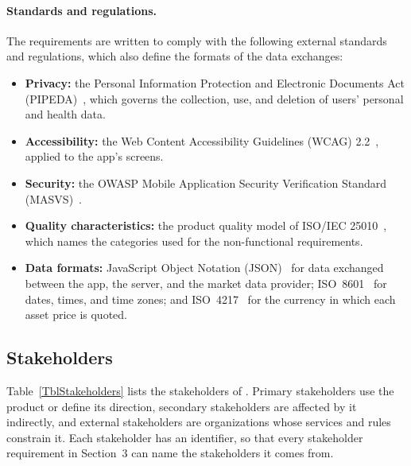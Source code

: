\documentclass[12pt]{article}
\begin{document}
\paragraph{Standards and regulations.} The requirements are written to comply
with the following external standards and regulations, which also define the
formats of the data \progname{} exchanges:
{\sloppy
\begin{itemize}
  \item \textbf{Privacy:} the Personal Information Protection and Electronic
        Documents Act (PIPEDA)~\citep{PIPEDA}, which governs the collection, use, and
        deletion of users' personal and health data.
  \item \textbf{Accessibility:} the Web Content Accessibility Guidelines (WCAG)
        2.2~\citep{WCAG22}, applied to the app's screens.
  \item \textbf{Security:} the OWASP Mobile Application Security Verification
        Standard (MASVS)~\citep{OWASPMASVS}.
  \item \textbf{Quality characteristics:} the product quality model of ISO/IEC
        25010~\citep{ISOIEC25010_2023}, which names the categories used for the
        non-functional requirements.
  \item \textbf{Data formats:} JavaScript Object Notation (JSON)~\citep{RFC8259}
        for data exchanged between the app, the server, and the market data provider;
        ISO~8601~\citep{ISO8601_2019} for dates, times, and time zones; and
        ISO~4217~\citep{ISO4217_2015} for the currency in which each asset price is
        quoted.
\end{itemize}
\par}

\subsection{Stakeholders}

Table~\ref{TblStakeholders} lists the stakeholders of \progname{}. Primary
stakeholders use the product or define its direction, secondary stakeholders
are affected by it indirectly, and external stakeholders are organizations whose
services and rules constrain it. Each stakeholder has an identifier, so that
every stakeholder requirement in Section~3 can name the stakeholders it comes
from.
\end{document}
